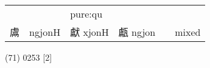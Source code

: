 \documentclass[14pt,a4paper]{scrartcl}
\begin{document}
\begin{longtable}[c]{@{}llllll@{}}
\begin{minipage}[t]{0.14\columnwidth}
\strut\end{minipage} &
\begin{minipage}[t]{0.14\columnwidth}\raggedright\strut
\strut\end{minipage} &
\begin{minipage}[t]{0.14\columnwidth}\raggedright\strut
pure:qu
\strut\end{minipage}\tabularnewline
\begin{minipage}[t]{0.14\columnwidth}\raggedright\strut
鬳
\strut\end{minipage} &
\begin{minipage}[t]{0.14\columnwidth}\raggedright\strut
ngjonH
\strut\end{minipage} &
\begin{minipage}[t]{0.14\columnwidth}\raggedright\strut
獻 xjonH
\strut\end{minipage} &
\begin{minipage}[t]{0.14\columnwidth}\raggedright\strut
甗 ngjon
\strut\end{minipage} &
\begin{minipage}[t]{0.14\columnwidth}\raggedright\strut
\strut\end{minipage} &
\begin{minipage}[t]{0.14\columnwidth}\raggedright\strut
mixed
\strut\end{minipage}\tabularnewline
\bottomrule
\end{longtable}

(71) 0253 {[}2{]}
\end{document}
